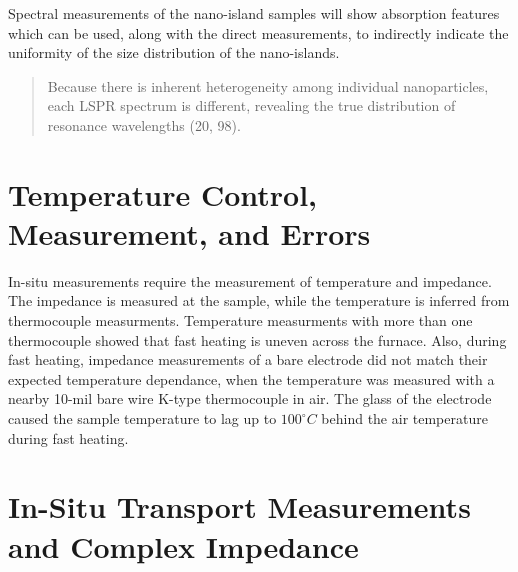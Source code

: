 \documentclass[12pt,oneside,english]{article}
\begin{document}
    
    Spectral measurements of the nano-island samples will show absorption features which can be used, along with the direct measurements, to indirectly indicate the uniformity of the size distribution of the nano-islands.
    
    \begin{quote}
        Because there is inherent heterogeneity among individual nanoparticles, each LSPR spectrum is different, revealing the true distribution of resonance wavelengths (20, 98).        
        \cite{willets2006}
    \end{quote}

    

    \clearpage 

    \section{Temperature Control, Measurement, and Errors}

    In-situ measurements require the measurement of temperature and impedance.  
    The impedance is measured at the sample, while the temperature is inferred from thermocouple measurments.
    Temperature measurments with more than one thermocouple showed that fast heating is uneven across the furnace.  
    Also, during fast heating, impedance measurements of a bare electrode did not match their expected temperature dependance, when the temperature was measured with a nearby 10-mil bare wire K-type thermocouple in air.
    The glass of the electrode caused the sample temperature to lag up to $100^{\circ}C$ behind the air temperature during fast heating.

    

    \section{In-Situ Transport Measurements and Complex Impedance}

    
\end{document}
